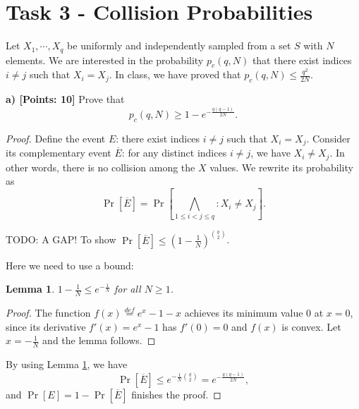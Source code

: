 \documentclass[12pt]{article}
\newcommand{\eqdef}{\stackrel{def}{=}}
\newtheorem{lemma}[theorem]{Lemma}
\theoremstyle{definition}
\begin{document}
\section{Task 3 - Collision Probabilities}
Let $X_1, \cdots, X_q$ be uniformly and independently sampled from a set $S$ with $N$ elements. We are interested in the probability $p_c(q, N)$ that there exist indices $i \not = j$ such that $X_i = X_j$. In class, we have proved that $p_c(q, N) \leq \frac{q^2}{2N}$.

{\bf a) [Points: 10]} Prove that
$$p_c(q, N) \geq 1-e^{-\frac{q(q-1)}{2N}}.$$
\begin{proof}
Define the event $E$: there exist indices $i \not = j$ such that $X_i = X_j$. 
Consider its complementary event $\overline{E}$: for any distinct indices $i \not= j$, we have $X_i \not= X_j$. In other words, there is no collision among the $X$ values. We rewrite its probability as
$$\Pr[\overline{E}] = \Pr[\bigwedge_{1\leq i < j \leq q} : X_i \not = X_j].$$

TODO: A GAP! To show $\Pr[\overline{E}] \leq \left( 1 - \frac{1}{N} \right)^{\binom{q}{2}}$.

Here we need to use a bound:
\begin{lemma}
\label{lem:1}
$1-\frac{1}{N} \leq e^{-\frac{1}{N}}$ for all $N\geq 1$.
\end{lemma}
\begin{proof}
The function $f(x) \eqdef e^x-1-x$ achieves its minimum value 0 at $x=0$, since its derivative $f'(x) = e^x-1$ has $f'(0)=0$ and $f(x)$ is convex. Let $x=-\frac{1}{N}$ and the lemma follows.
\end{proof}
By using Lemma \ref{lem:1}, we have
$$\Pr[\overline{E}] \leq e^{-\frac{1}{N}\binom{q}{2}} = e^{-\frac{q(q-1)}{2N}},$$
and $\Pr[E] = 1-\Pr[\overline{E}]$ finishes the proof.
\end{proof}
\end{document}
